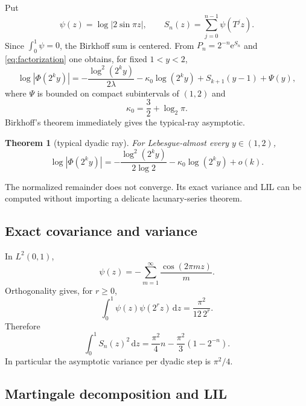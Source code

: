 \documentclass[11pt,oneside]{article}
\newtheorem{theorem}{Theorem}[section]
\theoremstyle{definition}
\theoremstyle{remark}
\newcommand{\e}{\mathrm e}
\newcommand{\dd}{\,\mathrm d}
\newcommand{\T}{T}
\begin{document}
Put
\begin{equation}
 \psi(z)=\log|2\sin\pi z|,
 \qquad
 S_n(z)=\sum_{j=0}^{n-1}\psi(\T^jz).
 \label{eq:psi-S}
\end{equation}
Since \(\int_0^1\psi=0\), the Birkhoff sum is centered.  From
\(P_n=2^{-n}\e^{S_n}\) and \eqref{eq:factorization} one obtains, for fixed
\(1<y<2\),
\begin{equation}
 \log|\Phi(2^ky)|
 =-\frac{\log^2(2^ky)}{2\lambda}
  -\kappa_0\log(2^ky)
  +S_{k+1}(y-1)+\Psi(y),
 \label{eq:ray-exact}
\end{equation}
where \(\Psi\) is bounded on compact subintervals of \((1,2)\) and
\begin{equation}
 \kappa_0=\frac32+\log_2\pi.
 \label{eq:kappa0}
\end{equation}
Birkhoff's theorem immediately gives the typical-ray asymptotic.

\begin{theorem}[typical dyadic ray]
\label{thm:typical-ray}
For Lebesgue-almost every \(y\in(1,2)\),
\begin{equation}
 \log|\Phi(2^ky)|
 =-\frac{\log^2(2^ky)}{2\log2}
  -\kappa_0\log(2^ky)+o(k).
 \label{eq:typical-ray}
\end{equation}
\end{theorem}

The normalized remainder does not converge.  Its exact variance and LIL can be
computed without importing a delicate lacunary-series theorem.

\subsection{Exact covariance and variance}

In \(L^2(0,1)\),
\begin{equation}
 \psi(z)=-\sum_{m=1}^{\infty}\frac{\cos(2\pi mz)}{m}.
 \label{eq:psi-fourier}
\end{equation}
Orthogonality gives, for \(r\ge0\),
\begin{equation}
 \int_0^1\psi(z)\psi(2^rz)\dd z
 =\frac{\pi^2}{12\,2^r}.
 \label{eq:covariance}
\end{equation}
Therefore
\begin{equation}
 \boxed{
 \int_0^1S_n(z)^2\dd z
 =\frac{\pi^2}{4}n-\frac{\pi^2}{3}(1-2^{-n}).}
 \label{eq:exact-variance}
\end{equation}
In particular the asymptotic variance per dyadic step is \(\pi^2/4\).

\subsection{Martingale decomposition and LIL}
\end{document}

